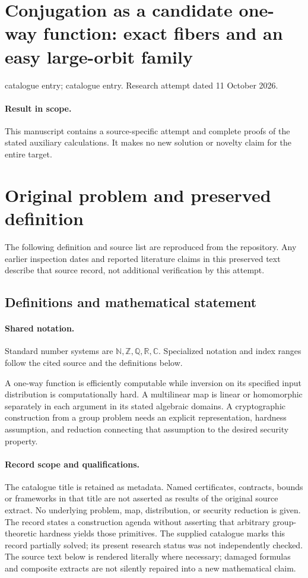 \documentclass[11pt]{article}
\begin{document}
\section*{Conjugation as a candidate one-way function: exact fibers and an easy large-orbit family}
\noindent catalogue entry; catalogue entry. Research attempt dated 11 October 2026.
\paragraph{Result in scope.}This manuscript contains a source-specific attempt and complete proofs of the stated auxiliary calculations. It makes no new solution or novelty claim for the entire target.
\section{Original problem and preserved definition}
The following definition and source list are reproduced from the repository. Any earlier inspection dates and reported literature claims in this preserved text describe that source record, not additional verification by this attempt.
\subsection{Definitions and mathematical statement}

\paragraph{Shared notation.}Standard number systems are $\mathbb N,\mathbb Z,\mathbb Q,\mathbb R,\mathbb C$. Specialized notation and index ranges follow the cited source and the definitions below.


A one-way function is efficiently computable while inversion on its specified input distribution is computationally hard. A multilinear map is linear or homomorphic separately in each argument in its stated algebraic domains. A cryptographic construction from a group problem needs an explicit representation, hardness assumption, and reduction connecting that assumption to the desired security property.
\paragraph{Record scope and qualifications.}
The catalogue title is retained as metadata. Named certificates, contracts, bounds or frameworks in that title are not asserted as results of the original source extract.
No underlying problem, map, distribution, or security reduction is given. The record states a construction agenda without asserting that arbitrary group-theoretic hardness yields those primitives. The supplied catalogue marks this record partially solved; its present research status was not independently checked.
The source text below is rendered literally where necessary; damaged formulas and composite extracts are not silently repaired into a new mathematical claim.
\end{document}
